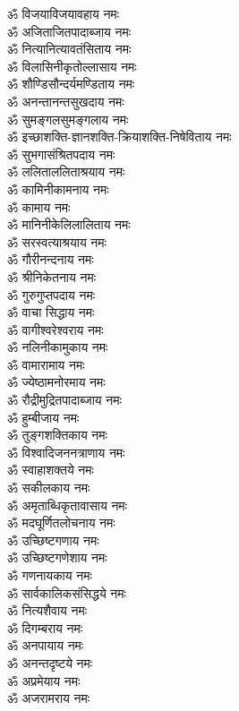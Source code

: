\begin{multicols}{2}
\begin{flushleft}
ॐ विजयाविजयावहाय नमः\hfill{}\\
ॐ अजिताजितपादाब्जाय नमः\\
ॐ नित्यानित्यावतंसिताय नमः\\
ॐ विलासिनीकृतोल्लासाय नमः\\
ॐ शौण्डिसौन्दर्यमण्डिताय नमः\\
ॐ अनन्तानन्तसुखदाय नमः\\
ॐ सुमङ्गलसुमङ्गलाय नमः\\
ॐ इच्छाशक्ति-ज्ञानशक्ति-क्रियाशक्ति-निषेविताय नमः\\
ॐ सुभगासंश्रितपदाय नमः\\
ॐ ललिताललिताश्रयाय नमः\\
ॐ कामिनीकामनाय नमः\hfill{}\\
ॐ कामाय नमः\\
ॐ मानिनीकेलिलालिताय नमः\\
ॐ सरस्वत्याश्रयाय नमः\\
ॐ गौरीनन्दनाय नमः\\
ॐ श्रीनिकेतनाय नमः\\
ॐ गुरुगुप्तपदाय नमः\\
ॐ वाचा सिद्धाय नमः\\
ॐ वागीश्वरेश्वराय नमः\\
ॐ नलिनीकामुकाय नमः\\
ॐ वामारामाय नमः\hfill{}\\
ॐ ज्येष्ठामनोरमाय नमः\\
ॐ रौद्रीमुद्रितपादाब्जाय नमः\\
ॐ हुम्बीजाय नमः\\
ॐ तुङ्गशक्तिकाय नमः\\
ॐ विश्वादिजननत्राणाय नमः\\
ॐ स्वाहाशक्तये नमः\\
ॐ सकीलकाय नमः\\
ॐ अमृताब्धिकृतावासाय नमः\\
ॐ मदघूर्णितलोचनाय नमः\\
ॐ उच्छिष्टगणाय नमः\hfill{}\\
ॐ उच्छिष्टगणेशाय नमः\\
ॐ गणनायकाय नमः\\
ॐ सार्वकालिकसंसिद्धये नमः\\
ॐ नित्यशैवाय नमः\\
ॐ दिगम्बराय नमः\\
ॐ अनपायाय नमः\\
ॐ अनन्तदृष्टये नमः\\
ॐ अप्रमेयाय नमः\\
ॐ अजरामराय नमः\\

\end{flushleft}
\end{multicols}

